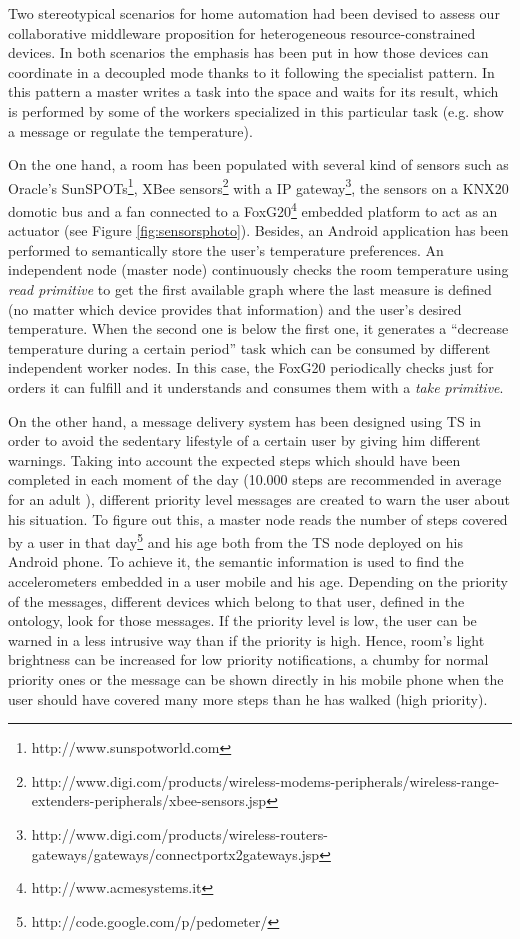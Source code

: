 Two stereotypical scenarios for home automation had been devised to assess our collaborative middleware proposition for heterogeneous resource-constrained devices.
In both scenarios the emphasis has been put in how those devices can coordinate in a decoupled mode thanks to it following the specialist pattern.
In this pattern a master writes a task into the space and waits for its result, which is performed by some of the workers specialized in this particular task (e.g. show a message or regulate the temperature).

On the one hand, a room has been populated with several kind of sensors such as Oracle's SunSPOTs\footnote{http://www.sunspotworld.com},
XBee sensors\footnote{http://www.digi.com/products/wireless-modems-peripherals/wireless-range-extenders-peripherals/xbee-sensors.jsp} with a IP gateway\footnote{http://www.digi.com/products/wireless-routers-gateways/gateways/connectportx2gateways.jsp},
the sensors on a KNX20 domotic bus and a fan connected to a FoxG20\footnote{http://www.acmesystems.it} embedded platform to act as an actuator (see Figure \ref{fig:sensorsphoto}).
Besides, an Android application has been performed to semantically store the user's temperature preferences.
An independent node (master node) continuously checks the room temperature using \textit{read primitive} to get the first available graph where the last measure is defined (no matter which device provides that information) and the user's desired temperature.
When the second one is below the first one, it generates a ``decrease temperature during a certain period'' task which can be consumed by different independent worker nodes.
In this case, the FoxG20 periodically checks just for orders it can fulfill and it understands and consumes them with a \textit{take primitive}.

On the other hand, a message delivery system has been designed using TS in order to avoid the sedentary lifestyle of a certain user by giving him different warnings.
Taking into account the expected steps which should have been completed in each moment of the day (10.000 steps are recommended in average for an adult \citep{tudor2002taking}), different priority level messages are created to warn the user about his situation.
To figure out this, a master node reads the number of steps covered by a user in that day\footnote{http://code.google.com/p/pedometer/} and his age both from the TS node deployed on his Android phone.
To achieve it, the semantic information is used to find the accelerometers embedded in a user mobile and his age. Depending on the priority of the messages, different devices which belong to that user, defined in the ontology, look for those messages.
If the priority level is low, the user can be warned in a less intrusive way than if the priority is high. Hence, room's light brightness can be increased for low priority notifications, a chumby for normal priority ones or the message can be shown directly in his mobile phone when the user should have covered many more steps than he has walked (high priority).